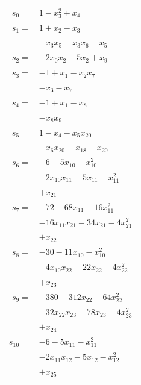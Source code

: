 \begingroup
\small
\setlength{\tabcolsep}{2pt}
\setlength{\LTleft}{0pt}
\begin{longtable}{@{}r@{\;}l@{}}
\(s_{0}=\) & \(\displaystyle 1 -x_{3}^{2} +x_{4}\) \\[3pt]
\(s_{1}=\) & \(\displaystyle 1 +x_{2} -x_{3}\) \\
 & \(\displaystyle -x_{3}x_{5} -x_{3}x_{6} -x_{5}\) \\[3pt]
\(s_{2}=\) & \(\displaystyle -2x_{0}x_{2} -5x_{2} +x_{9}\) \\[3pt]
\(s_{3}=\) & \(\displaystyle -1 +x_{1} -x_{2}x_{7}\) \\
 & \(\displaystyle -x_{3} -x_{7}\) \\[3pt]
\(s_{4}=\) & \(\displaystyle -1 +x_{1} -x_{8}\) \\
 & \(\displaystyle -x_{8}x_{9}\) \\[3pt]
\(s_{5}=\) & \(\displaystyle 1 -x_{4} -x_{5}x_{20}\) \\
 & \(\displaystyle -x_{6}x_{20} +x_{18} -x_{20}\) \\[3pt]
\(s_{6}=\) & \(\displaystyle -6 -5x_{10} -x_{10}^{2}\) \\
 & \(\displaystyle -2x_{10}x_{11} -5x_{11} -x_{11}^{2}\) \\
 & \(\displaystyle +x_{21}\) \\[3pt]
\(s_{7}=\) & \(\displaystyle -72 -68x_{11} -16x_{11}^{2}\) \\
 & \(\displaystyle -16x_{11}x_{21} -34x_{21} -4x_{21}^{2}\) \\
 & \(\displaystyle +x_{22}\) \\[3pt]
\(s_{8}=\) & \(\displaystyle -30 -11x_{10} -x_{10}^{2}\) \\
 & \(\displaystyle -4x_{10}x_{22} -22x_{22} -4x_{22}^{2}\) \\
 & \(\displaystyle +x_{23}\) \\[3pt]
\(s_{9}=\) & \(\displaystyle -380 -312x_{22} -64x_{22}^{2}\) \\
 & \(\displaystyle -32x_{22}x_{23} -78x_{23} -4x_{23}^{2}\) \\
 & \(\displaystyle +x_{24}\) \\[3pt]
\(s_{10}=\) & \(\displaystyle -6 -5x_{11} -x_{11}^{2}\) \\
 & \(\displaystyle -2x_{11}x_{12} -5x_{12} -x_{12}^{2}\) \\
 & \(\displaystyle +x_{25}\) \\[3pt]

\end{longtable}
